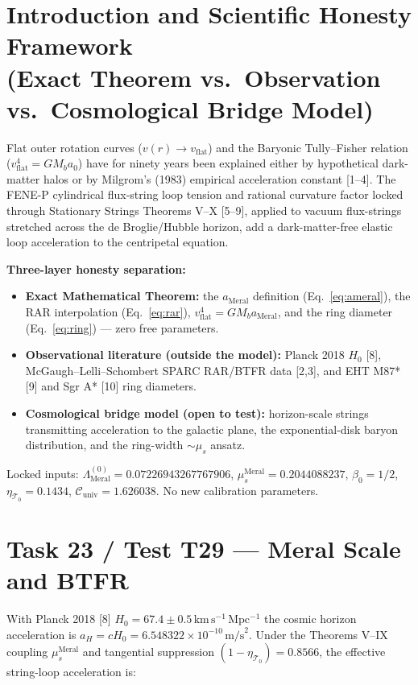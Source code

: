 \documentclass[12pt,a4paper]{article}
\begin{document}
\section{Introduction and Scientific Honesty Framework \\ (Exact Theorem vs.\ Observation vs.\ Cosmological Bridge Model)}

Flat outer rotation curves ($v(r)\to v_{\mathrm{flat}}$) and the Baryonic
Tully--Fisher relation ($v_{\mathrm{flat}}^4 = GM_b a_0$) have for ninety years
been explained either by hypothetical dark-matter halos or by Milgrom's (1983)
empirical acceleration constant [1--4]. The FENE-P cylindrical flux-string loop
tension and rational curvature factor locked through Stationary Strings
Theorems V--X [5--9], applied to vacuum flux-strings stretched across the
de Broglie/Hubble horizon, add a dark-matter-free elastic loop acceleration to
the centripetal equation.

\textbf{Three-layer honesty separation:}
\begin{itemize}
    \item \textbf{Exact Mathematical Theorem:} the $a_{\mathrm{Meral}}$
    definition (Eq.~\ref{eq:ameral}), the RAR interpolation (Eq.~\ref{eq:rar}),
    $v_{\mathrm{flat}}^4 = GM_b a_{\mathrm{Meral}}$, and the ring diameter
    (Eq.~\ref{eq:ring}) --- zero free parameters.
    \item \textbf{Observational literature (outside the model):} Planck 2018
    $H_0$ [8], McGaugh--Lelli--Schombert SPARC RAR/BTFR data [2,3], and
    EHT M87* [9] and Sgr A* [10] ring diameters.
    \item \textbf{Cosmological bridge model (open to test):} horizon-scale
    strings transmitting acceleration to the galactic plane, the exponential-disk
    baryon distribution, and the ring-width $\sim \mu_s$ ansatz.
\end{itemize}
Locked inputs: $\Lambda_{\mathrm{Meral}}^{(0)} = 0.07226943267767906$,
$\mu_s^{\mathrm{Meral}} = 0.2044088237$, $\beta_0 = 1/2$,
$\eta_{\mathcal{T}_0} = 0.1434$,
$\mathcal{C}_{\mathrm{univ}} = 1.626038$. No new calibration parameters.

\section{Task 23 / Test T29 --- Meral Scale and BTFR}

With Planck 2018 [8] $H_0 = 67.4\pm 0.5\,\mathrm{km\,s^{-1}\,Mpc^{-1}}$ the
cosmic horizon acceleration is
$a_H = cH_0 = 6.548322\times 10^{-10}\,\mathrm{m/s}^2$. Under the Theorems V--IX
coupling $\mu_s^{\mathrm{Meral}}$ and tangential suppression
$(1-\eta_{\mathcal{T}_0}) = 0.8566$, the effective string-loop acceleration is:
\end{document}
